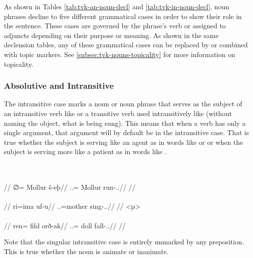 As shown in Tables \ref{tab:tvk-an-noun-decl} and \ref{tab:tvk-in-noun-decl}, \langtvk{} noun phrases decline to five different grammatical cases\autocite{wals-49} in order to show their role in the sentence. These cases are governed by the phrase's verb or assigned to adjuncts depending on their purpose or meaning. As shown in the same declension tables, any of these grammatical cases can be replaced by or combined with topic markers. See \autoref{subsec:tvk-nouns-topicality} for more information on topicality.

\subsubsection{Absolutive and Intransitive}
\label{subsubsec:tvk-nouns-absolutive}

The intransitive case marks a noun or noun phrase that serves as the subject of an intransitive verb like    or a transitive verb used intransitively like    (without naming the object, what is being sung). This means that when a verb has only a single argument, that argument will by default be in the intransitive case. That is true whether the subject is serving like an agent as in words like    or    or when the subject is serving more like a patient as in words like   .

	\begingl
		\glpreamble{}\\
		\\
		//
		\gla ∅= Mollur š-eþ//
		\glb \An.\Sg.\Intr= Mollur run-\Ind.\Npst.\Prg//
		\glft{}//
	\endgl
	\a<a2>\begingl
		\glpreamble{}\\
		\\
		//
		\gla ri=ima uf-u//
		\glb \An.\Pc.\Intr=mother sing-\Ind.\Npst.\Ipfv//
		\glft{}//
	\endgl
	\begingl
		\glpreamble{}\\
		\\
		//
		\gla ren= fild orð-ak//
		\glb \In.\Pl.\Intr= doll fall-\Ind.\Pst.\Pfv//
		\glft{}//
	\endgl
\xe

Note that the singular intransitive case is entirely unmarked by any preposition. This is true whether the noun is animate or inanimate.

